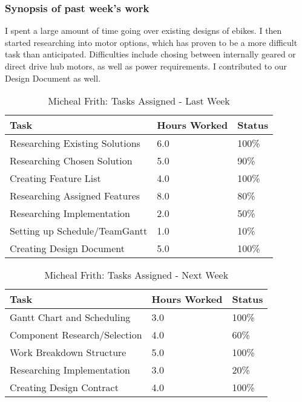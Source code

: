 \documentclass[12pt,article,compsoc]{IEEEtran}
\begin{document}
	\subsubsection*{Synopsis of past week's work}
        I spent a large amount of time going over existing designs of ebikes. I then started researching into motor options, 
        which has proven to be a more difficult task than anticipated. Difficulties include chosing between internally geared 
        or direct drive hub motors, as well as power requirements. I contributed to our Design Document as well.
	

	\begin{table}[ht]
	\renewcommand{\arraystretch}{1.3}
		\caption{Micheal Frith: Tasks Assigned - Last Week}
		
		\label{Summary of Micheal Frith's activities: last week}
		
		\centering
		\begin{tabular}{p{5.5cm}|p{1cm}|p{1cm}}
		\hline
		\bfseries 	Task		 							& \bfseries Hours Worked	& \bfseries Status	\\
		\hline\hline
					Researching Existing Solutions			& 6.0						& 100\%				\\
					Researching Chosen Solution				& 5.0						& 90\%				\\
					Creating Feature List					& 4.0						& 100\%				\\	
					Researching Assigned Features           & 8.0                       & 80\%              \\
                    Researching Implementation				& 2.0						& 50\%				\\
					Setting up Schedule/TeamGantt			& 1.0						& 10\%				\\	
					Creating Design Document				& 5.0						& 100\%				\\
		\hline
		\end{tabular}
	\end{table}

    \begin{table}[ht]
	\renewcommand{\arraystretch}{1.3}
		\caption{Micheal Frith: Tasks Assigned - Next Week}
		
		\label{Summary of Micheal Frith's activities: this week}
		
		\centering
		\begin{tabular}{p{5.5cm}|p{1cm}|p{1cm}}
		\hline
		\bfseries 	Task		 		                    & \bfseries Hours Worked	& \bfseries Status	\\
		\hline\hline
    				Gantt Chart and Scheduling  			& 3.0						& 100\%				\\
					Component Research/Selection			& 4.0						& 60\%				\\	
					Work Breakdown Structure                & 5.0                       & 100\%             \\
                    Researching Implementation				& 3.0						& 20\%				\\					
					Creating Design Contract				& 4.0						& 100\%				\\
		\hline
		\end{tabular}
	\end{table}
\end{document}
